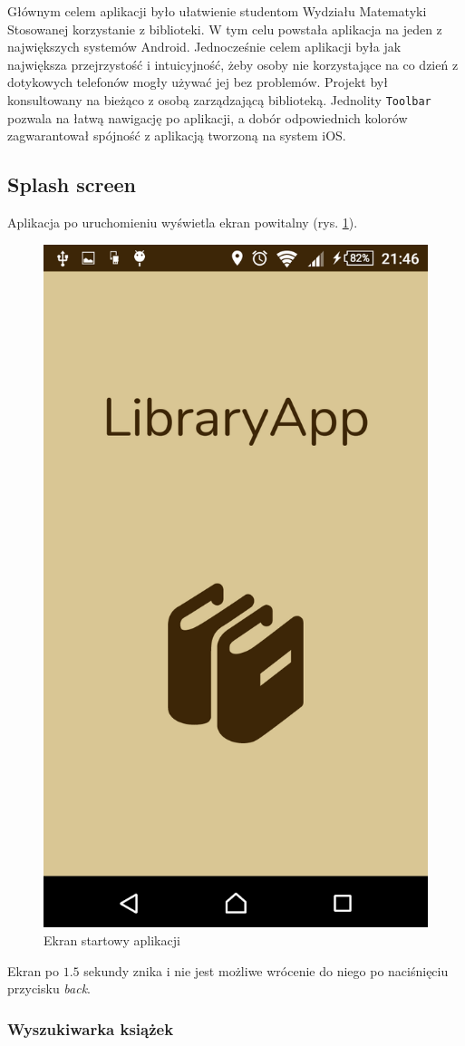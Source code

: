 \documentclass[twoside]{projektInzynierskiMS}
\begin{document}
Głównym celem aplikacji było ułatwienie studentom Wydziału Matematyki Stosowanej korzystanie z biblioteki. W tym celu powstała aplikacja na jeden z największych systemów Android. Jednocześnie celem aplikacji była jak największa przejrzystość i intuicyjność, żeby osoby nie korzystające na co dzień z dotykowych telefonów mogły używać jej bez problemów. Projekt był konsultowany na bieżąco z osobą zarządzającą biblioteką. Jednolity \verb`Toolbar` pozwala na łatwą nawigację po aplikacji, a dobór odpowiednich kolorów zagwarantował spójność z aplikacją tworzoną na system iOS.
 
\subsection{Splash screen}

Aplikacja po uruchomieniu wyświetla ekran powitalny (rys. \ref{fig:splashScreen}). 

\begin{figure}[h]
  \centering
  \includegraphics[width=0.4\linewidth]{img/android/android1.PNG}
  \caption{Ekran startowy aplikacji}
  \label{fig:splashScreen}
\end{figure}

Ekran po $1.5$ sekundy znika i nie jest możliwe wrócenie do niego po naciśnięciu przycisku \textit{back}.

\subsubsection{Wyszukiwarka książek}
\end{document}
